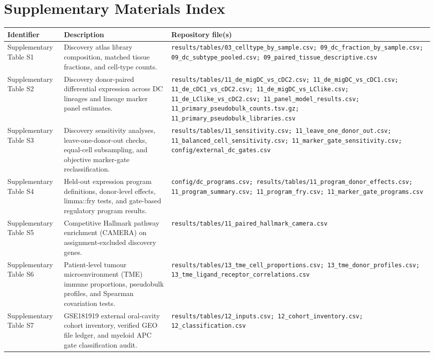 \documentclass[11pt,a4paper]{article}
\begin{document}
\section*{Supplementary Materials Index}
\begin{table}[htbp]
\centering
\scriptsize
\begin{tabular}{p{3.2cm}p{5.8cm}p{5.8cm}}
\toprule
Identifier & Description & Repository file(s) \\
\midrule
Supplementary Table S1 & Discovery atlas library composition, matched tissue fractions, and cell-type counts. & \texttt{results/tables/03\_celltype\_by\_sample.csv; 09\_dc\_fraction\_by\_sample.csv; 09\_dc\_subtype\_pooled.csv; 09\_paired\_tissue\_descriptive.csv} \\
Supplementary Table S2 & Discovery donor-paired differential expression across DC lineages and lineage marker panel estimates. & \texttt{results/tables/11\_de\_migDC\_vs\_cDC2.csv; 11\_de\_migDC\_vs\_cDC1.csv; 11\_de\_cDC1\_vs\_cDC2.csv; 11\_de\_migDC\_vs\_LClike.csv; 11\_de\_LClike\_vs\_cDC2.csv; 11\_panel\_model\_results.csv; 11\_primary\_pseudobulk\_counts.tsv.gz; 11\_primary\_pseudobulk\_libraries.csv} \\
Supplementary Table S3 & Discovery sensitivity analyses, leave-one-donor-out checks, equal-cell subsampling, and objective marker-gate reclassification. & \texttt{results/tables/11\_sensitivity.csv; 11\_leave\_one\_donor\_out.csv; 11\_balanced\_cell\_sensitivity.csv; 11\_marker\_gate\_sensitivity.csv; config/external\_dc\_gates.csv} \\
Supplementary Table S4 & Held-out expression program definitions, donor-level effects, limma::fry tests, and gate-based regulatory program results. & \texttt{config/dc\_programs.csv; results/tables/11\_program\_donor\_effects.csv; 11\_program\_summary.csv; 11\_program\_fry.csv; 11\_marker\_gate\_programs.csv} \\
Supplementary Table S5 & Competitive Hallmark pathway enrichment (CAMERA) on assignment-excluded discovery genes. & \texttt{results/tables/11\_paired\_hallmark\_camera.csv} \\
Supplementary Table S6 & Patient-level tumour microenvironment (TME) immune proportions, pseudobulk profiles, and Spearman covariation tests. & \texttt{results/tables/13\_tme\_cell\_proportions.csv; 13\_tme\_donor\_profiles.csv; 13\_tme\_ligand\_receptor\_correlations.csv} \\
Supplementary Table S7 & GSE181919 external oral-cavity cohort inventory, verified GEO file ledger, and myeloid APC gate classification audit. & \texttt{results/tables/12\_inputs.csv; 12\_cohort\_inventory.csv; 12\_classification.csv} \\

\end{tabular}
\end{table}
\end{document}
